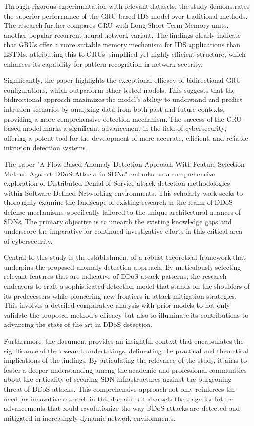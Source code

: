 Through rigorous experimentation with relevant datasets, the study demonstrates the superior performance of the GRU-based IDS model over traditional methods. The research further compares GRU with Long Short-Term Memory units, another popular recurrent neural network variant. The findings clearly indicate that GRUs offer a more suitable memory mechanism for IDS applications than LSTMs, attributing this to GRUs' simplified yet highly efficient structure, which enhances its capability for pattern recognition in network security.\par 
Significantly, the paper highlights the exceptional efficacy of bidirectional GRU configurations, which outperform other tested models. This suggests that the bidirectional approach maximizes the model's ability to understand and predict intrusion scenarios by analyzing data from both past and future contexts, providing a more comprehensive detection mechanism. The success of the GRU-based model marks a significant advancement in the field of cybersecurity, offering a potent tool for the development of more accurate, efficient, and reliable intrusion detection systems\cite{xu2018intrusion}.
\par 
The paper "A Flow-Based Anomaly Detection Approach With Feature Selection Method Against DDoS Attacks in SDNs" embarks on a comprehensive exploration of Distributed Denial of Service attack detection methodologies within Software-Defined Networking environments. This scholarly work seeks to thoroughly examine the landscape of existing research in the realm of DDoS defense mechanisms, specifically tailored to the unique architectural nuances of SDNs. The primary objective is to unearth the existing knowledge gaps and underscore the imperative for continued investigative efforts in this critical area of cybersecurity.\par 
Central to this study is the establishment of a robust theoretical framework that underpins the proposed anomaly detection approach. By meticulously selecting relevant features that are indicative of DDoS attack patterns, the research endeavors to craft a sophisticated detection model that stands on the shoulders of its predecessors while pioneering new frontiers in attack mitigation strategies. This involves a detailed comparative analysis with prior models to not only validate the proposed method's efficacy but also to illuminate its contributions to advancing the state of the art in DDoS detection.\par 
Furthermore, the document provides an insightful context that encapsulates the significance of the research undertakings, delineating the practical and theoretical implications of the findings. By articulating the relevance of the study, it aims to foster a deeper understanding among the academic and professional communities about the criticality of securing SDN infrastructures against the burgeoning threat of DDoS attacks. This comprehensive approach not only reinforces the need for innovative research in this domain but also sets the stage for future advancements that could revolutionize the way DDoS attacks are detected and mitigated in increasingly dynamic network environments\cite{9810168}.
